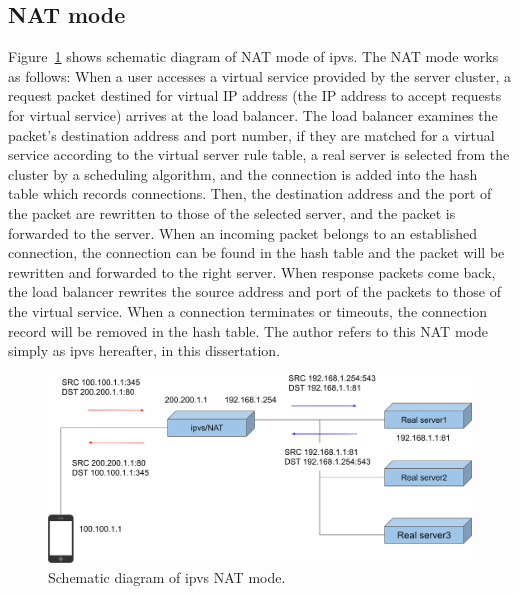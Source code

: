\subsection{NAT mode}

Figure~\ref{fig:ipvs-nat-schem} shows schematic diagram of NAT mode of ipvs.
The NAT mode works as follows: When a user accesses a virtual service provided by the server cluster, a request packet destined for virtual IP address (the IP address to accept requests for virtual service) arrives at the load balancer.
The load balancer examines the packet's destination address and port number, if they are matched for a virtual service according to the virtual server rule table, a real server is selected from the cluster by a scheduling algorithm, and the connection is added into the hash table which records connections. 
Then, the destination address and the port of the packet are rewritten to those of the selected server, and the packet is forwarded to the
server. 
When an incoming packet belongs to an established connection, the connection can be found in the hash table and the packet will be rewritten and forwarded to the right server. 
When response packets come back, the load balancer rewrites the source address and port of the packets to those of the virtual service. When a connection terminates or timeouts, the connection record will be removed in the hash table.
%
The author refers to this NAT mode simply as ipvs hereafter, in this dissertation.

\begin{figure}[h]
  \centering
  \includegraphics[width=0.9\columnwidth]{Figs/ipvs-nat-schem}

  \par\bigskip
  \centering
  \begin{minipage}{0.9\columnwidth}
    \caption[ipvs NAT mode]{
      Schematic diagram of ipvs NAT mode.
    }
    \label{fig:ipvs-nat-schem}
  \end{minipage}
\end{figure}

